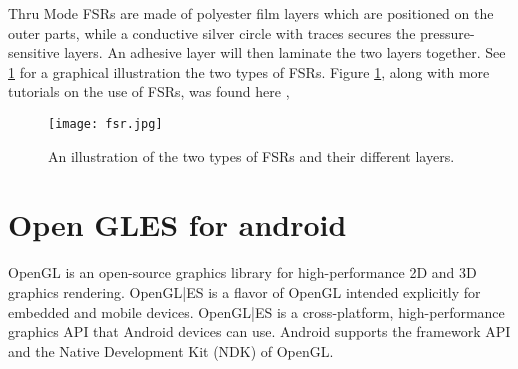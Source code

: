 Thru Mode FSRs are made of polyester film layers which are positioned on the outer parts, while a conductive silver circle with traces secures the pressure-sensitive layers. An adhesive layer will then laminate the two layers together. See \ref{fig:fsr} for a graphical illustration the two types of FSRs. Figure \ref{fig:fsr}, along with more tutorials on the use of FSRs, was found here \cite{tekscan2022}, \cite{gigiseeedstudio2020}

\begin{figure}[!h]
    \centering
    \texttt{[image: fsr.jpg]}
    \caption{An illustration of the two types of FSRs and their different layers.}
    \label{fig:fsr}
\end{figure}


\section{Open GLES for android}
\label{sec:OpenGL}
OpenGL is an open-source graphics library for high-performance 2D and 3D graphics rendering. OpenGL|ES is a flavor of OpenGL intended explicitly for embedded and mobile devices. OpenGL|ES is a cross-platform, high-performance graphics API that Android devices can use. Android supports the framework API and the Native Development Kit (NDK) of OpenGL.  

